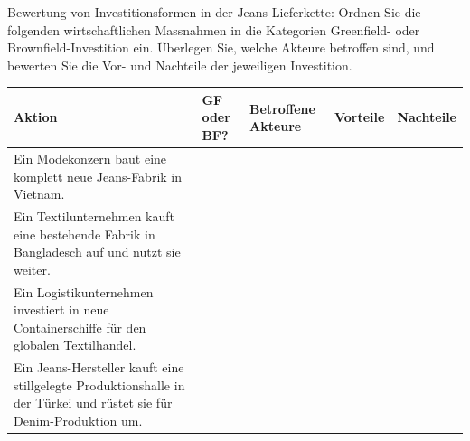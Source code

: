 \begin{myexercise}
Bewertung von Investitionsformen in der Jeans-Lieferkette:
Ordnen Sie die folgenden wirtschaftlichen Massnahmen in die Kategorien Greenfield- oder Brownfield-Investition ein. Überlegen Sie, welche Akteure betroffen sind, und bewerten Sie die Vor- und Nachteile der jeweiligen Investition.
\begin{table}[H]
\footnotesize
\centering
\begin{tabular}{p{3cm}||p{1cm}|p{3.5cm}|p{3cm}|p{3cm}}
\textbf{Aktion} & \textbf{GF oder BF?} & \textbf{Betroffene Akteure} & \textbf{Vorteile} & \textbf{Nachteile} \\
\midrule\midrule
Ein Modekonzern baut eine komplett neue Jeans-Fabrik in Vietnam. & & & & \\[1.2cm]\midrule
Ein Textilunternehmen kauft eine bestehende Fabrik in Bangladesch auf und nutzt sie weiter. & & & & \\[1.2cm]\midrule
Ein Logistikunternehmen investiert in neue Containerschiffe für den globalen Textilhandel. & & & & \\[1.2cm]\midrule
Ein Jeans-Hersteller kauft eine stillgelegte Produktionshalle in der Türkei und rüstet sie für Denim-Produktion um. & & & & \\[1.2cm]%
\end{tabular}
\end{table}


\end{myexercise}
